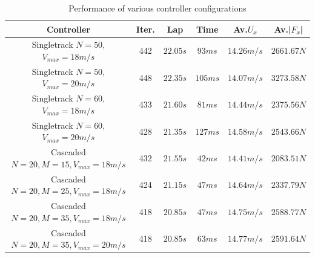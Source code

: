 \documentclass[a4paper, onecolumn, 12pt]{article}
\begin{document}
\begin{table}[h] 
    \centering
    \caption{Performance of various controller configurations} \label{simulations}
    \begin{tabular}{|c||c|c|c|c|c|}
        \hline
        \textbf{Controller} & \textbf{Iter.} & \textbf{Lap} & \textbf{Time} & \textbf{Av.$U_x$} & \textbf{Av.|$F_x$|} \\ [0.5ex] 
        \hline
        \hline
        Singletrack $N=50$, $V_{max}=18m/s$ & 442 & $22.05 s$ & $93 ms$ & $14.26 m/s$ & $2661.67 N$\\
        \hline
        Singletrack $N=50$, $V_{max}=20m/s$ & 448 & $22.35 s$ & $105 ms$ & $14.07 m/s$ & $3273.58 N$\\
        \hline
        Singletrack $N=60$, $V_{max}=18m/s$ & 433 & $21.60 s$ & $81 ms$ & $14.44 m/s$ & $2375.56 N$\\
        \hline
        Singletrack $N=60$, $V_{max}=20m/s$ & 428 & $21.35 s$ & $127 ms$ & $14.58 m/s$ & $2543.66 N$\\
        \hline
        Cascaded $N=20, M=15, V_{max}=18m/s$ & 432 & $21.55 s$ & $42 ms$ & $14.41 m/s$ & $2083.51 N$\\
        \hline
        Cascaded $N=20, M=25, V_{max}=18m/s$ & 424 & $21.15 s$ & $47 ms$ & $14.64 m/s$ & $2337.79 N$\\
        \hline
        Cascaded $N=20, M=35, V_{max}=18m/s$ & 418 & $20.85 s$ & $47 ms$ & $14.75 m/s$ & $2588.77 N$\\
        \hline
        Cascaded $N=20, M=35, V_{max}=20m/s$ & 418 & $20.85 s$ & $63 ms$ & $14.77 m/s$ & $2591.64 N$\\
        \hline
    \end{tabular}
    \label{experiments}
\end{table}
\end{document}
